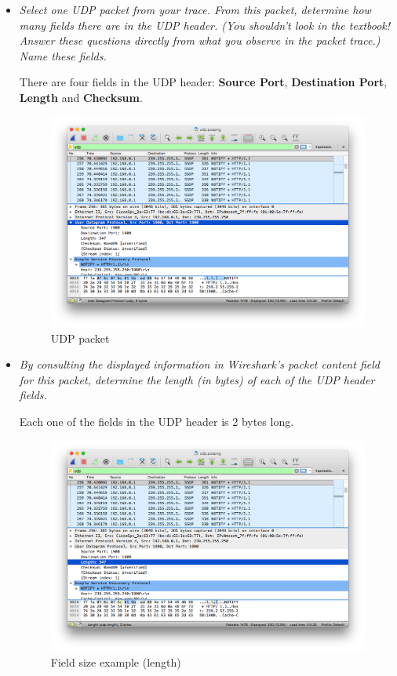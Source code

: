 \documentclass[11pt]{article}
\begin{document}
\begin{itemize}
	\setlength\itemsep{.5cm}

	\item
		\textit{Select one UDP packet from your trace. From this packet, determine how many fields there are in the UDP header. (You shouldn’t look in the textbook! Answer these questions directly from what you observe in the packet trace.) Name these fields.}
		\par There are four fields in the UDP header: \textbf{Source Port}, \textbf{Destination Port}, \textbf{Length} and \textbf{Checksum}.
		
		\begin{figure}[H]
		\centering
		\caption{UDP packet}
		\includegraphics[width=\textwidth]{01}
		\end{figure}

	\item
		\textit{By consulting the displayed information in Wireshark’s packet content field for this packet, determine the length (in bytes) of each of the UDP header fields.}
		\par Each one of the fields in the UDP header is 2 bytes long.
		
		\begin{figure}[H]
		\centering
		\caption{Field size example (length)}
		\includegraphics[width=\textwidth]{02}
		\end{figure}
	

\end{itemize}
\end{document}
